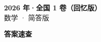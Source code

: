 \documentclass[zihao=-4, a4paper]{ctexart}
\begin{document}
\begin{center}
  {\Large\bfseries 2026 年·全国 1 卷（回忆版）}\\[4pt]
  {\large 数学 · 简答版}
\end{center}
\medskip
{}

\clearpage
{}
\begin{center}{\Large\bfseries 答案速查}\end{center}
\medskip

\end{document}
